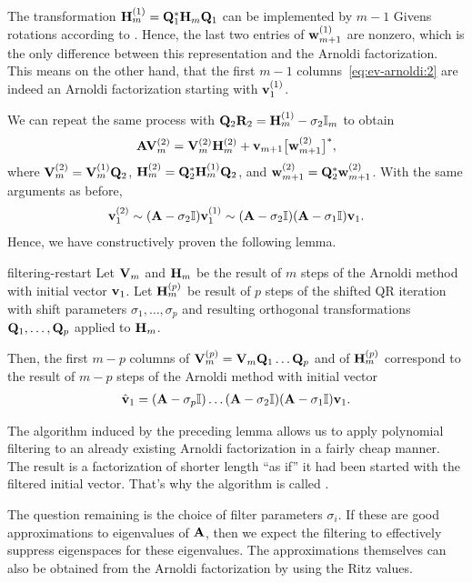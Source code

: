 \begin{intro}
  The transformation $\mathbf H_m^{(1)} = \mathbf Q_1^*\mathbf H_{m}\mathbf Q_1$ can
  be implemented by $m-1$ Givens rotations according to
  . Hence, the last two entries
  of $\mathbf w_{m+1}^{(1)}$ are nonzero, which is the only difference
  between this representation and the Arnoldi factorization. This
  means on the other hand, that the first $m-1$
  columns~\eqref{eq:ev-arnoldi:2} are indeed an Arnoldi factorization
  starting with $\mathbf v_1^{(1)}$.

  We can repeat the same process with
  $\mathbf Q_2\mathbf R_2 = \mathbf H_m^{(1)} - \sigma_2\mathbb I_m$ to obtain
  \begin{gather}
    \mathbf A\mathbf V_m^{(2)} = \mathbf V_m^{(2)} \mathbf H_m^{(2)}
    + \mathbf v_{m+1} \bigl[\mathbf w_{m+1}^{(2)}\bigr]^*,
  \end{gather}
  where $\mathbf V_m^{(2)} = \mathbf V_m^{(1)}\mathbf Q_2$,
  $\mathbf H_m^{(2)} = \mathbf Q_2^*\mathbf H_{m}^{(1)}\mathbf Q_2$, and
  $\mathbf w_{m+1}^{(2)} = \mathbf Q_2^*\mathbf w_{m+1}^{(2)}$.
  With the same arguments as before,
  \begin{gather}
    \mathbf v_1^{(2)} \sim (\mathbf A-\sigma_2\mathbb I)\mathbf v_1^{(1)}
    \sim (\mathbf A-\sigma_2\mathbb I) (\mathbf A-\sigma_1\mathbb I)\mathbf v_1.
  \end{gather}
  Hence, we have constructively proven the following lemma.
\end{intro}

\begin{Lemma}{filtering-restart}
  Let $\mathbf V_m$ and $\mathbf H_m$ be the result of $m$ steps of the
  Arnoldi method with initial vector $\mathbf v_1$. Let $\mathbf H_m^{(p)}$ be
  result of $p$ steps of the shifted QR iteration with shift
  parameters $\sigma_1,\dots,\sigma_p$ and resulting orthogonal
  transformations $\mathbf Q_1,\dots,\mathbf Q_p$ applied to $\mathbf H_m$.

  Then, the first $m-p$ columns of
  $\mathbf V_m^{(p)} = \mathbf V_m\mathbf Q_1\dots\mathbf Q_p$ and of $\mathbf H_m^{(p)}$
  correspond to the result of $m-p$ steps of the Arnoldi method with
  initial vector
  \begin{gather}
    \hat{\mathbf v}_1 = (\mathbf A-\sigma_p\mathbb I)\dots(\mathbf A-\sigma_2\mathbb I)(\mathbf A-\sigma_1\mathbb I)
    \mathbf v_1.
  \end{gather}
\end{Lemma}

\begin{intro}
  The algorithm induced by the preceding lemma allows us to apply
  polynomial filtering to an already existing Arnoldi factorization in
  a fairly cheap manner. The result is a factorization of shorter
  length ``as if'' it had been started with the filtered initial
  vector. That's why the algorithm is called .

  The question remaining is the choice of filter parameters
  $\sigma_i$. If these are good approximations to eigenvalues of
  $\mathbf A$, then we expect the filtering to effectively suppress
  eigenspaces for these eigenvalues. The approximations themselves can
  also be obtained from the Arnoldi factorization by using the Ritz
  values.
\end{intro}

